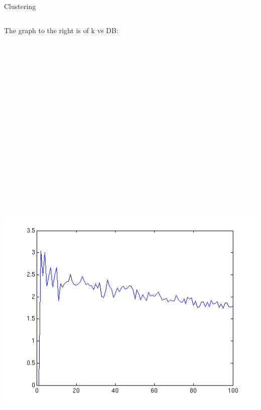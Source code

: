 \documentclass[final,t]{beamer}
\begin{document}
\begin{frame}{}
\begin{columns}[t]
\begin{column}{.3\linewidth}
\begin{block}{Clustering}
\begin{columns}[c,c]
The graph to the right is of k vs DB:\newline
  \includegraphics[width=60cm,height=36cm]{images/davies_k_vs_davies_index.png}
\end{columns} 




\end{block}
\end{column}
\end{columns}
\end{frame}
\end{document}
